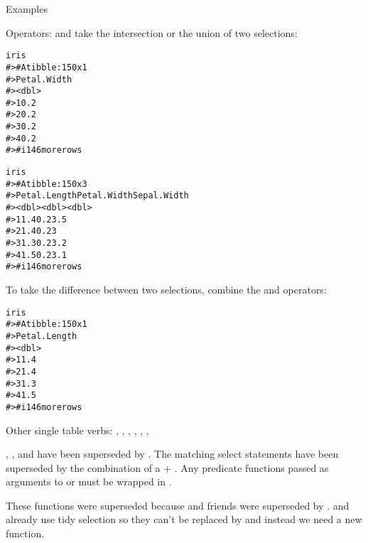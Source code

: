 \documentclass[a4paper]{book}
\begin{document}
\begin{Section}{Examples}
\begin{SubSection}{Operators:}
\code{\&} and \code{|} take the intersection or the union of two selections:

\begin{alltt}iris %>% select(starts_with("Petal") & ends_with("Width"))
#> # A tibble: 150 x 1
#>   Petal.Width
#>         <dbl>
#> 1         0.2
#> 2         0.2
#> 3         0.2
#> 4         0.2
#> # i 146 more rows

iris %>% select(starts_with("Petal") | ends_with("Width"))
#> # A tibble: 150 x 3
#>   Petal.Length Petal.Width Sepal.Width
#>          <dbl>       <dbl>       <dbl>
#> 1          1.4         0.2         3.5
#> 2          1.4         0.2         3  
#> 3          1.3         0.2         3.2
#> 4          1.5         0.2         3.1
#> # i 146 more rows
\end{alltt}


To take the difference between two selections, combine the \code{\&} and
\code{!} operators:

\begin{alltt}iris %>% select(starts_with("Petal") & !ends_with("Width"))
#> # A tibble: 150 x 1
#>   Petal.Length
#>          <dbl>
#> 1          1.4
#> 2          1.4
#> 3          1.3
#> 4          1.5
#> # i 146 more rows
\end{alltt}

\end{SubSection}

\end{Section}
%
\begin{SeeAlso}
Other single table verbs: 
,
,
,
,
,
,
\end{SeeAlso}
%
\begin{Description}
\strong{[Superseded]}

, , and  have been superseded by
. The matching select statements have been superseded by the
combination of a  + . Any predicate functions passed
as arguments to  or  must be wrapped in .

These functions were superseded because  and friends were
superseded by .  and  already use tidy
selection so they can't be replaced by  and instead we need a new
function.
\end{Description}
\end{document}
